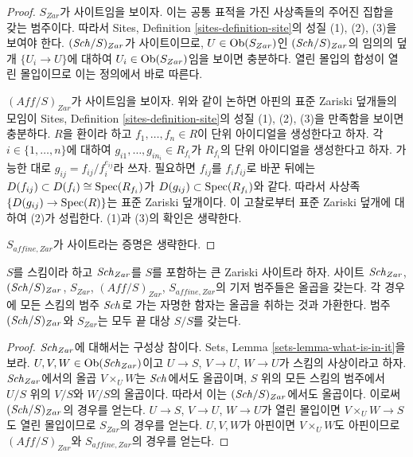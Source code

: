 \begin{proof}
$S_{Zar}$가 사이트임을 보이자. 이는 공통 표적을 가진 사상족들의 주어진
집합을 갖는 범주이다. 따라서 Sites, Definition
\ref{sites-definition-site}의 성질 (1), (2), (3)을 보여야 한다.
$(\mathit{Sch}/S)_{Zar}$가 사이트이므로, $U \in \mathop{\mathrm{Ob}}\nolimits(S_{Zar})$인
$(\mathit{Sch}/S)_{Zar}$의 임의의 덮개 $\{U_i \to U\}$에 대하여
$U_i \in \mathop{\mathrm{Ob}}\nolimits(S_{Zar})$임을 보이면 충분하다. 열린 몰입의 합성이 열린
몰입이므로 이는 정의에서 바로 따른다.

\medskip\noindent
$(\textit{Aff}/S)_{Zar}$가 사이트임을 보이자. 위와 같이 논하면 아핀의
표준 Zariski 덮개들의 모임이 Sites, Definition
\ref{sites-definition-site}의 성질 (1), (2), (3)을 만족함을 보이면
충분하다. $R$을 환이라 하고 $f_1, \ldots, f_n \in R$이 단위 아이디얼을
생성한다고 하자. 각 $i \in \{1, \ldots, n\}$에 대하여
$g_{i1}, \ldots, g_{in_i} \in R_{f_i}$가 $R_{f_i}$의 단위 아이디얼을
생성한다고 하자. 가능한 대로 $g_{ij} = f_{ij}/f_i^{e_{ij}}$라 쓰자.
필요하면 $f_{ij}$를 $f_i f_{ij}$로 바꾼 뒤에는
$D(f_{ij}) \subset D(f_i) \cong \mathop{\mathrm{Spec}}(R_{f_i})$가
$D(g_{ij}) \subset \mathop{\mathrm{Spec}}(R_{f_i})$와 같다. 따라서 사상족
$\{D(g_{ij}) \to \mathop{\mathrm{Spec}}(R)\}$는 표준 Zariski 덮개이다. 이 고찰로부터
표준 Zariski 덮개에 대하여 (2)가 성립한다. (1)과 (3)의 확인은 생략한다.

\medskip\noindent
$S_{affine, Zar}$가 사이트라는 증명은 생략한다.
\end{proof}

\begin{lemma}
\label{lemma-fibre-products-Zariski}
$S$를 스킴이라 하고 $\mathit{Sch}_{Zar}$를 $S$를 포함하는 큰 Zariski
사이트라 하자. 사이트 $\mathit{Sch}_{Zar}$, $(\mathit{Sch}/S)_{Zar}$, $S_{Zar}$,
$(\textit{Aff}/S)_{Zar}$, $S_{affine, Zar}$의 기저 범주들은 올곱을 갖는다.
각 경우에 모든 스킴의 범주 $\mathit{Sch}$로 가는 자명한 함자는 올곱을 취하는
것과 가환한다. 범주 $(\mathit{Sch}/S)_{Zar}$와 $S_{Zar}$는 모두 끝 대상
$S/S$를 갖는다.
\end{lemma}

\begin{proof}
$\mathit{Sch}_{Zar}$에 대해서는 구성상 참이다. Sets, Lemma
\ref{sets-lemma-what-is-in-it}을 보라. $U, V, W \in \mathop{\mathrm{Ob}}\nolimits(\mathit{Sch}_{Zar})$이고
$U \to S$, $V \to U$, $W \to U$가 스킴의 사상이라고 하자.
$\mathit{Sch}_{Zar}$에서의 올곱 $V \times_U W$는 $\mathit{Sch}$에서도 올곱이며,
$S$ 위의 모든 스킴의 범주에서 $U/S$ 위의 $V/S$와 $W/S$의 올곱이다.
따라서 이는 $(\mathit{Sch}/S)_{Zar}$에서도 올곱이다. 이로써
$(\mathit{Sch}/S)_{Zar}$의 경우를 얻는다. $U \to S$, $V \to U$, $W \to U$가
열린 몰입이면 $V \times_U W \to S$도 열린 몰입이므로 $S_{Zar}$의
경우를 얻는다. $U, V, W$가 아핀이면 $V \times_U W$도 아핀이므로
$(\textit{Aff}/S)_{Zar}$와 $S_{affine, Zar}$의 경우를 얻는다.
\end{proof}

